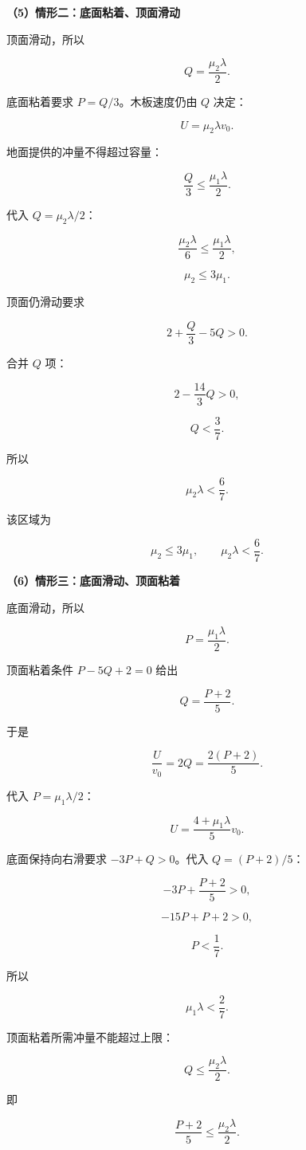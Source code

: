 \documentclass[12pt,a4paper,UTF8]{ctexart}
\begin{document}
\textbf{（5）情形二：底面粘着、顶面滑动}

顶面滑动，所以

\[Q=\frac{\mu_2\lambda}{2}.\]

底面粘着要求 \(P=Q/3\)。木板速度仍由 \(Q\) 决定：

\[\boxed{U=\mu_2\lambda v_0}.\]

地面提供的冲量不得超过容量：

\[\frac Q3\le\frac{\mu_1\lambda}{2}.\]

代入 \(Q=\mu_2\lambda/2\)：

\[\frac{\mu_2\lambda}{6}\le\frac{\mu_1\lambda}{2},\]

\[\boxed{\mu_2\le3\mu_1}.\]

顶面仍滑动要求

\[2+\frac Q3-5Q>0.\]

合并 \(Q\) 项：

\[2-\frac{14}{3}Q>0,\]

\[Q<\frac37.\]

所以

\[\boxed{\mu_2\lambda<\frac67}.\]

该区域为

\[\boxed{
\mu_2\le3\mu_1,
\qquad
\mu_2\lambda<\frac67
}.\]

\textbf{（6）情形三：底面滑动、顶面粘着}

底面滑动，所以

\[P=\frac{\mu_1\lambda}{2}.\]

顶面粘着条件 \(P-5Q+2=0\) 给出

\[Q=\frac{P+2}{5}.\]

于是

\[\frac U{v_0}=2Q=\frac{2(P+2)}5.\]

代入 \(P=\mu_1\lambda/2\)：

\[\boxed{U=\frac{4+\mu_1\lambda}{5}v_0}.\]

底面保持向右滑要求 \(-3P+Q>0\)。代入 \(Q=(P+2)/5\)：

\[-3P+\frac{P+2}{5}>0,\]

\[-15P+P+2>0,\]

\[P<\frac17.\]

所以

\[\boxed{\mu_1\lambda<\frac27}.\]

顶面粘着所需冲量不能超过上限：

\[Q\le\frac{\mu_2\lambda}{2}.\]

即

\[\frac{P+2}{5}\le\frac{\mu_2\lambda}{2}.\]
\end{document}
